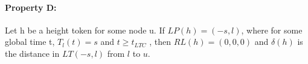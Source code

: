 \paragraph{Property D:}Let h be a height token for some node u. If $LP(h) = (-s, l)$, where for some global time t, $T_l (t) = s$ and $t \geq t_{LTC}$ , then $RL(h) = (0, 0, 0)$ and $\delta (h)$ is the distance in $LT (-s, l)$ from $l$ to $u$.
